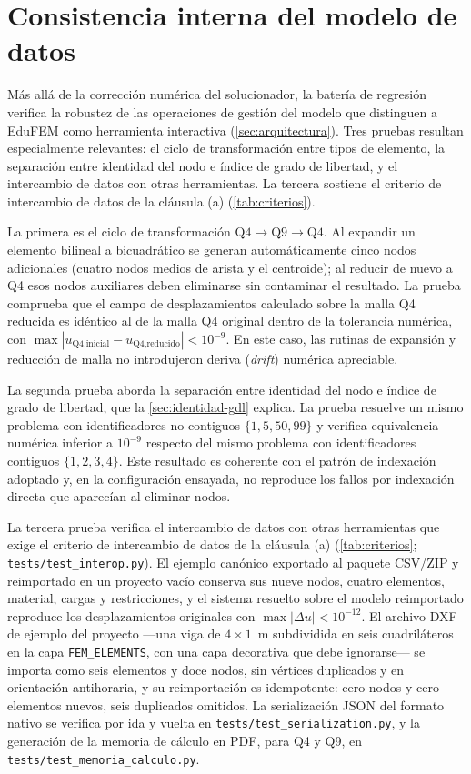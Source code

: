 \section{Consistencia interna del modelo de datos}
\label{sec:consistencia-interna}

Más allá de la corrección numérica del solucionador, la batería de regresión verifica la robustez de las operaciones de gestión del modelo que distinguen a EduFEM como herramienta interactiva (\autoref{sec:arquitectura}). Tres pruebas resultan especialmente relevantes: el ciclo de transformación entre tipos de elemento, la separación entre identidad del nodo e índice de grado de libertad, y el intercambio de datos con otras herramientas. La tercera sostiene el criterio de intercambio de datos de la cláusula (a) (\autoref{tab:criterios}).

La primera es el ciclo de transformación $\text{Q4}\rightarrow\text{Q9}\rightarrow\text{Q4}$. Al expandir un elemento bilineal a bicuadrático se generan automáticamente cinco nodos adicionales (cuatro nodos medios de arista y el centroide); al reducir de nuevo a Q4 esos nodos auxiliares deben eliminarse sin contaminar el resultado. La prueba comprueba que el campo de desplazamientos calculado sobre la malla Q4 reducida es idéntico al de la malla Q4 original dentro de la tolerancia numérica, con $\max|u_{\text{Q4,inicial}} - u_{\text{Q4,reducido}}| < 10^{-9}$. En este caso, las rutinas de expansión y reducción de malla no introdujeron deriva (\emph{drift}) numérica apreciable.

La segunda prueba aborda la separación entre identidad del nodo e índice de grado de libertad, que la \autoref{sec:identidad-gdl} explica. La prueba resuelve un mismo problema con identificadores no contiguos $\{1,5,50,99\}$ y verifica equivalencia numérica inferior a $10^{-9}$ respecto del mismo problema con identificadores contiguos $\{1,2,3,4\}$. Este resultado es coherente con el patrón de indexación adoptado y, en la configuración ensayada, no reproduce los fallos por indexación directa que aparecían al eliminar nodos.

La tercera prueba verifica el intercambio de datos con otras herramientas que exige el criterio de intercambio de datos de la cláusula (a) (\autoref{tab:criterios}; \texttt{tests/test\_interop.py}). El ejemplo canónico exportado al paquete CSV/ZIP y reimportado en un proyecto vacío conserva sus nueve nodos, cuatro elementos, material, cargas y restricciones, y el sistema resuelto sobre el modelo reimportado reproduce los desplazamientos originales con $\max|\Delta u| < 10^{-12}$. El archivo DXF de ejemplo del proyecto —una viga de $4\times1$~m subdividida en seis cuadriláteros en la capa \texttt{FEM\_ELEMENTS}, con una capa decorativa que debe ignorarse— se importa como seis elementos y doce nodos, sin vértices duplicados y en orientación antihoraria, y su reimportación es idempotente: cero nodos y cero elementos nuevos, seis duplicados omitidos. La serialización JSON del formato nativo se verifica por ida y vuelta en \texttt{tests/test\_serialization.py}, y la generación de la memoria de cálculo en PDF, para Q4 y Q9, en \texttt{tests/test\_memoria\_calculo.py}.


